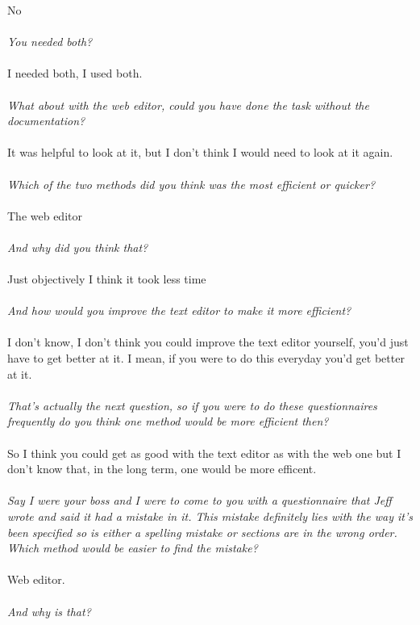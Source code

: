 \documentclass{report}
\begin{document}
No
\\
\\
\textit{You needed both?}
\\
\\
I needed both, I used both.
\\
\\
\textit{What about with the web editor, could you have done the task without the documentation?}
\\
\\
It was helpful to look at it, but I don't think I would need to look at it again.
\\
\\
\textit{Which of the two methods did you think was the most efficient or quicker?}
\\
\\
The web editor
\\
\\
\textit{And why did you think that?}
\\
\\
Just objectively I think it took less time
\\
\\
\textit{And how would you improve the text editor to make it more efficient?}
\\
\\
I don't know, I don't think you could improve the text editor yourself, you'd just have to get better at it. I mean, if you were to do this everyday you'd get better at it.
\\
\\
\textit{That's actually the next question, so if you were to do these questionnaires frequently do you think one method would be more efficient then?}
\\
\\
So I think you could get as good with the text editor as with the web one but I don't know that, in the long term, one would be more efficent.
\\
\\
\textit{Say I were your boss and I were to come to you with a questionnaire that Jeff wrote and said it had a mistake in it. This mistake definitely lies with the way it's been specified so is either a spelling mistake or sections are in the wrong order. Which method would be easier to find the mistake?}
\\
\\
Web editor.
\\
\\
\textit{And why is that?}
\\
\end{document}
